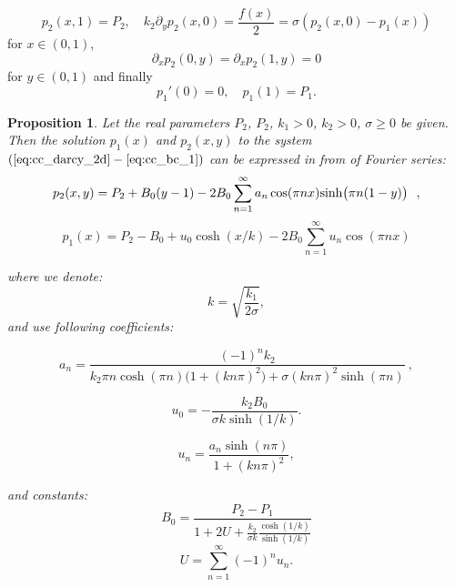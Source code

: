 \documentclass[a4paper,10pt]{article}
\newtheorem{prop}{Proposition}
\def\prtl{\partial} %
\begin{document}
\begin{equation}
    \label{eq:cc_bc_x}
    p_2(x, 1) = P_2, \quad
    k_2\prtl_y p_2(x,0) = \frac{f(x)}{2}
                        = \sigma(p_2(x,0) - p_1(x))
\end{equation}
for  $x\in (0,1)$,
\begin{equation}
    \label{eq:cc_bc_y}
    \prtl_x p_2(0,y) = \prtl_x p_2(1,y) = 0    
\end{equation}
for $y \in (0, 1)$ and finally
\begin{equation}
    \label{eq:cc_bc_1}
    p_1'(0) = 0, \quad  p_1(1) = P_1. 
\end{equation}

\begin{prop}
\label{proposition_continuous}
Let the real parameters $P_2$, $P_2$, $k_1>0$, $k_2>0$, $\sigma\ge0$ be given. Then the solution $p_1(x)$ and $p_2(x,y)$ to the system 
$(\ref{eq:cc_darcy_2d} - \ref{eq:cc_bc_1})$ can be expressed in from of Fourier series:
\begin{equation}
    \label{eq:p2_series}
    p_2(x,y) = P_2 + B_0(y-1) -2B_0 \sum_{n=1}^\infty a_n \cos(\pi n x) {\rm sinh} \big(\pi n(1-y)\big)  \ \ ,
\end{equation}
%
\begin{equation}
    \label{eq:p1_series}
    p_1(x) = P_2-B_0 +u_0 \cosh(x/k) -2B_0 \sum_{n=1}^\infty  u_n \cos(\pi n x) 
\end{equation}

where we denote:
\[
    k = \sqrt{\frac{k_1}{2\sigma}}, 
\]    
and use following coefficients:

\begin{equation}
    \label{eq:an}
    a_n = \frac{(-1)^n k_2}{ k_2 \pi n \cosh(\pi n) \big(1 + (k n \pi)^2\big) 
    + \sigma (k n \pi)^2 \sinh(\pi n)} \ , 
\end{equation}

\begin{equation}
    \label{eq:u0}
    u_0 = -\frac{k_2 B_0}{\sigma k\sinh(1/k)}.
\end{equation}

\begin{equation}
    \label{eq:un}
    u_n = \frac{a_n \sinh(n \pi)}{1 + (k n \pi)^2}, 
\end{equation}

and constants:
\begin{equation}
     \label{eq:b0}
     B_0 = \frac{P_2 - P_1}{1 + 2  U + \frac{k_2}{\sigma k} \frac{\cosh(1/k)}{\sinh(1/k)}} 
\end{equation}
\begin{equation}
    \label{eq:U}
    U =  \sum_{n=1}^{\infty} (-1)^n u_n.
\end{equation}

\end{prop}
\end{document}
